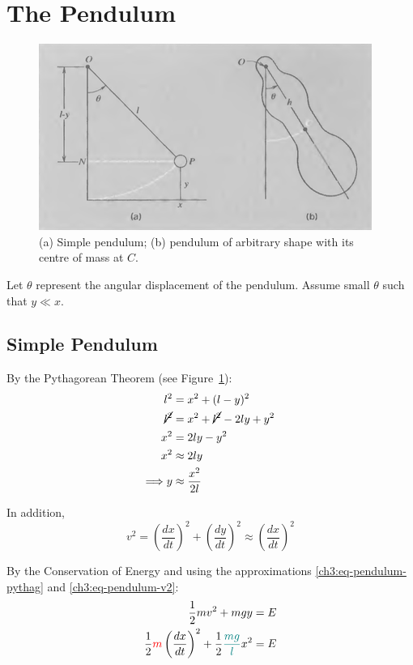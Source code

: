 \section{The Pendulum}
\begin{figure}
	\centering
	\includegraphics[scale=0.6]{phys232/Ch3-pendulum.png} \caption{(a) Simple pendulum; (b) pendulum of arbitrary shape with its centre of mass at $C$.}\label{ch3:fig-pendulum}
\end{figure}

Let $\theta$ represent the angular displacement of the pendulum. Assume small $\theta$ such that $y \ll x$. 


\subsection{Simple Pendulum} \label{ch3:sec-simple-pendulum}
By the Pythagorean Theorem (see Figure~\ref{ch3:fig-pendulum}):
\begin{align}
l^2 &= x^2 + (l-y)^2  \notag \\	
\cancel{l^2} &= x^2 + \cancel{l^2} - 2ly + y^2 \notag \\
x^2 &= 2ly - {y^2} \notag \\
x^2 &\approx 2ly  \notag \\
\Longrightarrow y &\approx \frac{x^2}{2l} \label{ch3:eq-pendulum-pythag}
\end{align}

In addition,
\begin{equation}
v^2=\left( \frac{dx}{dt} \right)^2 + \left(\frac{dy}{dt} \right)^2
\approx  \left( \frac{dx}{dt} \right)^2 \label{ch3:eq-pendulum-v2}
\end{equation}

By the Conservation of Energy and using the approximations \eqref{ch3:eq-pendulum-pythag} and  \eqref{ch3:eq-pendulum-v2}:
\begin{align}
\frac{1}{2} mv^2 + mgy &= E \notag \\
\frac{1}{2} \textcolor{red}{m} \left( \frac{dx}{dt} \right)^2 + \frac{1}{2} \textcolor{teal}{\frac{mg}{l}} x^2 &= E  \label{ch3:eq-pendulum-E}
\end{align}


